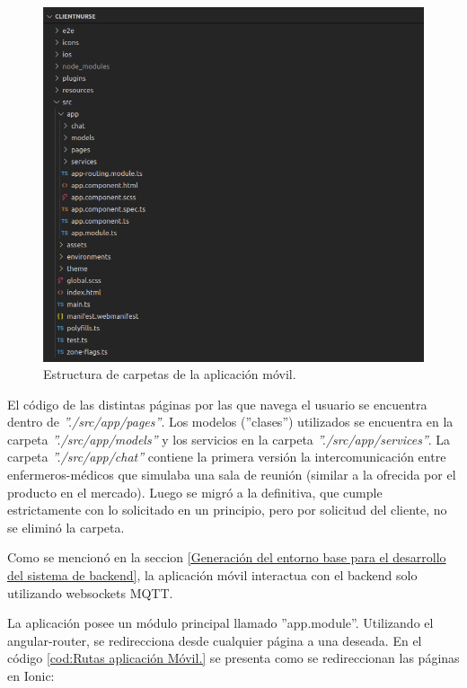 \begin{figure}[ht]
	\centering
	\includegraphics[scale=.60]{./Figures/app/estructura-app.png}
	\caption{ Estructura de carpetas de la aplicación móvil.}
	\label{fig: Estructura de código fuente de la aplicación móvil.}
\end{figure} 

El código de las distintas páginas por las que navega el usuario se encuentra dentro de \textit{''./src/app/pages''}. Los modelos (''clases'') utilizados se encuentra en la carpeta \textit{''./src/app/models''} y los servicios en la carpeta \textit{''./src/app/services''}. La carpeta \textit{''./src/app/chat''} contiene la primera versión la intercomunicación entre enfermeros-médicos que simulaba una sala de reunión  (similar a la ofrecida por el producto en el mercado). Luego se migró a la definitiva, que cumple estrictamente con lo solicitado en un principio, pero por solicitud del cliente, no se eliminó la carpeta.

Como se mencionó en la seccion \ref{Generación del entorno base para el desarrollo del sistema de backend}, la aplicación móvil interactua con el backend solo utilizando websockets MQTT.

La aplicación posee un módulo principal llamado ''app.module''. Utilizando el angular-router, se redirecciona desde cualquier página a una deseada. En el código \ref{cod:Rutas aplicación Móvil.} se presenta como se redireccionan las páginas en Ionic:

